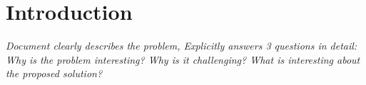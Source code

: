 \section{Introduction}
\textit{Document clearly describes the problem, Explicitly answers 3 questions in detail: Why is the problem interesting? Why is it challenging? What is interesting about the proposed solution?
}